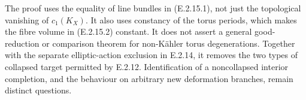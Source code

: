 \begin{remark}
The proof uses the equality of line bundles in
(E.2.15.1), not just the topological vanishing of
$c_1(K_X)$.  It also uses constancy of the torus periods,
which makes the fibre volume in (E.2.15.2) constant.
It does not assert a general good-reduction or
comparison theorem for non-K\"ahler torus degenerations.
Together with the separate elliptic-action exclusion
in E.2.14, it removes the two types of collapsed
target permitted by E.2.12.  Identification of a
noncollapsed interior completion, and the behaviour
on arbitrary new deformation branches, remain
distinct questions.
\end{remark}
